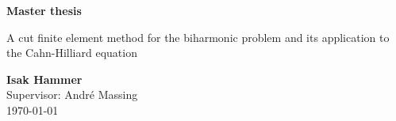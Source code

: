 \documentclass[11pt]{article}
\begin{document}
\begin{titlepage}
    \begin{center}
        \vspace*{1cm}

        \Huge
        \textbf{Master thesis}

        \vspace{0.5cm}
        \Large
        A cut finite element method for the biharmonic problem and
        its application to the Cahn-Hilliard equation

        \vspace{1.5cm}

        \textbf{Isak Hammer} \\
        \vspace{0.5cm}
        Supervisor: André Massing \\
        \vspace{0.5cm}
        \today


        \vfill

        \vspace{0.8cm}


\end{center}
\end{titlepage}
\end{document}
